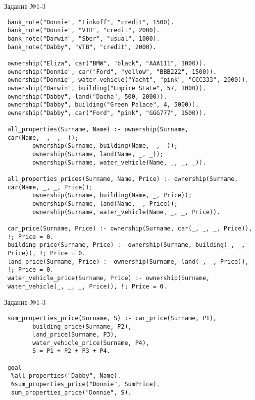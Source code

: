 \begin{code}
\caption{Задание №1-3}
\label{code:bf2}
\begin{verbatim}
 bank_note("Donnie", "Tinkoff", "credit", 1500).
 bank_note("Donnie", "VTB", "credit", 2000).
 bank_note("Darwin", "Sber", "usual", 1000).
 bank_note("Dabby", "VTB", "credit", 2000).
 
 ownership("Eliza", car("BMW", "black", "AAA111", 1000)).
 ownership("Donnie", car("Ford", "yellow", "BBB222", 1500)).
 ownership("Donnie", water_vehicle("Yacht", "pink", "CCC333", 2000)).
 ownership("Darwin", building("Empire State", 57, 1000)).
 ownership("Dabby", land("Dacha", 500, 2000)).
 ownership("Dabby", building("Green Palace", 4, 5000)).
 ownership("Dabby", car("Ford", "pink", "GGG777", 1500)).
 
 all_properties(Surname, Name) :- ownership(Surname, 
 car(Name, _, _, _)); 
 		ownership(Surname, building(Name, _, _)); 
 		ownership(Surname, land(Name, _, _)); 
 		ownership(Surname, water_vehicle(Name, _, _, _)).
 
 all_properties_prices(Surname, Name, Price) :- ownership(Surname, 
 car(Name, _, _, Price)); 
 		ownership(Surname, building(Name, _, Price)); 
 		ownership(Surname, land(Name, _, Price));
 		ownership(Surname, water_vehicle(Name, _, _, Price)).
 				  
 car_price(Surname, Price) :- ownership(Surname, car(_, _, _, Price)),
 !; Price = 0.
 building_price(Surname, Price) :- ownership(Surname, building(_, _, 
 Price)), !; Price = 0.
 land_price(Surname, Price) :- ownership(Surname, land(_, _, Price)), 
 !; Price = 0.
 water_vehicle_price(Surname, Price) :- ownership(Surname, 
 water_vehicle(_, _, _, Price)), !; Price = 0.
\end{verbatim}
\end{code}

\begin{code}
\caption{Задание №1-3}
\label{code:bf2}
\begin{verbatim}				  
 sum_properties_price(Surname, S) :- car_price(Surname, P1),
 		building_price(Surname, P2),
 		land_price(Surname, P3),
 		water_vehicle_price(Surname, P4),
 		S = P1 + P2 + P3 + P4.
 
 goal
  %all_properties("Dabby", Name).
  %sum_properties_price("Donnie", SumPrice).
  sum_properties_price("Donnie", S).
\end{verbatim}
\end{code}

